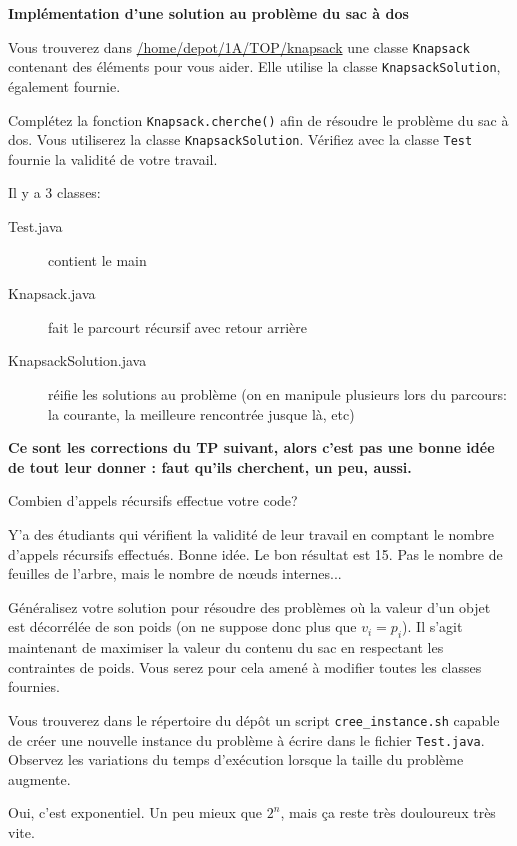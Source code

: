 \documentclass[10pt]{article}\usepackage[correction,nu]{esial}
\begin{document}
\Exercice\textbf{Implémentation d'une solution au problème du sac à dos}

Vous trouverez dans \url{/home/depot/1A/TOP/knapsack} une classe
\texttt{Knapsack} contenant des éléments pour vous aider. Elle utilise la
classe \texttt{KnapsackSolution}, également fournie. 

\Question Complétez la fonction \texttt{Knapsack.cherche()} afin de résoudre le
problème du sac à dos. Vous utiliserez la classe \texttt{KnapsackSolution}.
Vérifiez avec la classe \texttt{Test} fournie la validité de votre travail.

\begin{Reponse}
  Il y a 3 classes:
  \begin{description}
  \item[Test.java] contient le main
  \item[Knapsack.java] fait le parcourt récursif avec retour arrière
  \item[KnapsackSolution.java] réifie les solutions au problème (on en
    manipule plusieurs lors du parcours: la courante, la meilleure
    rencontrée jusque là, etc)
  \end{description}

  \noindent\textbf{Ce sont les corrections du TP suivant, alors c'est pas une
    bonne idée de tout leur donner : faut qu'ils cherchent, un peu,
    aussi.}
    
\end{Reponse}


\Question Combien d'appels récursifs effectue votre code?

\begin{Reponse}
  Y'a des étudiants qui vérifient la validité de leur travail en comptant le
  nombre d'appels récursifs effectués. Bonne idée. Le bon résultat est 15. Pas
  le nombre de feuilles de l'arbre, mais le nombre de nœuds internes...
\end{Reponse}

\Question Généralisez votre solution pour résoudre des problèmes où la valeur
d'un objet est décorrélée de son poids (on ne suppose donc plus que $v_i=p_i$).
Il s'agit maintenant de maximiser la valeur du contenu du sac en respectant les
contraintes de poids. Vous serez pour cela amené à modifier toutes les classes
fournies.

\Question Vous trouverez dans le répertoire du dépôt un script
\texttt{cree\_instance.sh} capable de créer une nouvelle instance du problème à
écrire dans le fichier \texttt{Test.java}. Observez les variations du temps
d'exécution lorsque la taille du problème augmente.

\begin{Reponse}
  Oui, c'est exponentiel. Un peu mieux que $2^n$, mais ça reste très douloureux
  très vite.
\end{Reponse}
\end{document}
